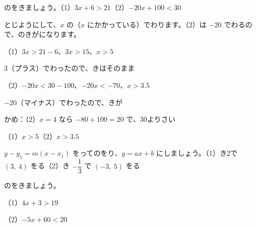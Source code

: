 \begin{reidai}[1\R{次不等式}{じ|ふ|とう|しき}を\R{解}{と}く]
のをきましょう。\quad（1）\nobreak $3x+6>21$\quad（2）\nobreak $-20x+100<30$\par
\kangaekata {}とじようにして、$x$ の（$x$ にかかっている）でわります。（2）は $-20$ でわるので、のきがになります。\par
\shiki（1）\nobreak $3x>21-6$、$3x>15$、$x>5$\par
\hspace*{2.6\zw}\phantom{（1）}3（プラス）でわったので、きはそのまま\par
\hspace*{2.6\zw}（2）\nobreak $-20x<30-100$、$-20x<-70$、$x>3.5$\par
\hspace*{2.6\zw}\phantom{（2）}$-20$（マイナス）でわったので、きが\par
\hspace*{2.6\zw}かめ：（2）\nobreak $x=4$ なら $-80+100=20$ で、30よりさい\par
\kotae（1）\nobreak $x>5$\quad（2）\nobreak $x>3.5$
\end{reidai}

\begingroup{}%
\noindent\begin{minipage}[t]{0.49\linewidth}
\begin{jibun}\raggedright
$y-y_1=m(x-x_1)$ をってのをり、$y=ax+b$ にしましょう。（1）\nobreak {}き2で $(3,\ 4)$ をる\quad（2）\nobreak {}き $-\dfrac{1}{3}$ で $(-3,\ 5)$ をる
\end{jibun}
\end{minipage}\hfill
\begin{minipage}[t]{0.49\linewidth}
\begin{jibun}\raggedright
{}のをきましょう。\par
（1）\nobreak $4x+3>19$\par
（2）\nobreak $-5x+60<20$
\end{jibun}
\end{minipage}\par
\endgroup


